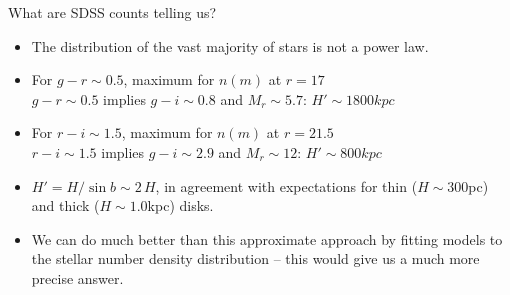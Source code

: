 \documentclass[letterpaper,landscape]{slides}
\begin{document}
\begin{slide}
\begin{center}
{\large \color{red}  What are SDSS counts telling us? }
\end{center}

\begin{itemize}
\item
{\color{blue} The distribution of the vast majority of stars is not a power law.}

\item
{\color{blue} For $g-r\sim0.5$, maximum for $n(m)$ at $r=17$} \\
    $g-r\sim0.5$ implies $g-i\sim0.8$ and $M_r\sim5.7$: $H'\sim1800 kpc$

\item
{\color{blue} For $r-i\sim1.5$, maximum for $n(m)$ at $r=21.5$} \\
    $r-i\sim1.5$ implies $g-i\sim2.9$ and $M_r\sim12$: $H'\sim800 kpc$

\item
{\color{red} $H' = H/\sin{b} \sim 2\,H$,} in agreement with expectations
for thin ($H\sim300$pc) and thick ($H\sim1.0$kpc) disks.


\item
{\color{blue} We can do much better than this approximate approach by
	fitting models to the stellar number density distribution -- this would give
	us a much more precise answer.}
\end{itemize}  
\vfill
\end{slide}
\end{document}
